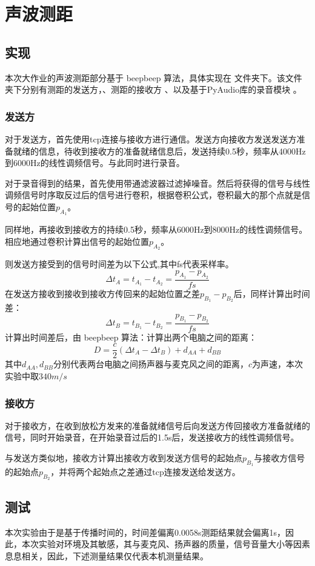\section{声波测距}
\subsection{实现}
本次大作业的声波测距部分基于 beepbeep 算法，具体实现在  文件夹下。该文件夹下分别有测距的发送方，、测距的接收方 、以及基于PyAudio库的录音模块 。 
\subsubsection{发送方}
对于发送方，首先使用tcp连接与接收方进行通信。发送方向接收方发送发送方准备就绪的信息，待收到接收方的准备就绪信息后，发送持续0.5秒，频率从4000Hz到6000Hz的线性调频信号。与此同时进行录音。

对于录音得到的结果，首先使用带通滤波器过滤掉噪音。然后将获得的信号与线性调频信号时序取反过后的信号进行卷积，根据卷积公式，卷积最大的那个点就是信号的起始位置$p_{A_1}$。

同样地，再接收到接收方的持续0.5秒，频率从6000Hz到8000Hz的线性调频信号。相应地通过卷积计算出信号的起始位置$p_{A_2}$。

则发送方接受到的信号时间差为以下公式,其中fs代表采样率。
$$
\Delta t_A = t_{A_1} - t_{A_2}=\frac{p_{A_1}-p_{A_2}}{fs}
$$
在发送方接收到接收到接收方传回来的起始位置之差$p_{B_1}-p_{B_2}$后，同样计算出时间差：
$$
\Delta t_B = t_{B_1} - t_{B_2}=\frac{p_{B_1}-p_{B_2}}{fs}
$$
计算出时间差后，由 beepbeep 算法：计算出两个电脑之间的距离：
$$
D = \frac{c}{2}(\Delta t_A - \Delta t_B) + d_{AA} + d_{BB}
$$
其中$d_{AA} , d_{BB}$分别代表两台电脑之间扬声器与麦克风之间的距离，$c$为声速，本次实验中取$340m/s$
\subsubsection{接收方}
对于接收方，在收到放松方发来的准备就绪信号后向发送方传回接收方准备就绪的信号，同时开始录音，在开始录音过后的1.5s后，发送接收方的线性调频信号。

与发送方类似地，接收方计算出接收方收到发送方信号的起始点$p_{B_1}$与接收方信号的起始点$p_{B_2}$，并将两个起始点之差通过tcp连接发送给发送方。
\subsection{测试}
本次实验由于是基于传播时间的，时间差偏离0.0058s测距结果就会偏离1s，因此，本次实验对环境及其敏感，其与麦克风、扬声器的质量，信号音量大小等因素息息相关，因此，下述测量结果仅代表本机测量结果。

